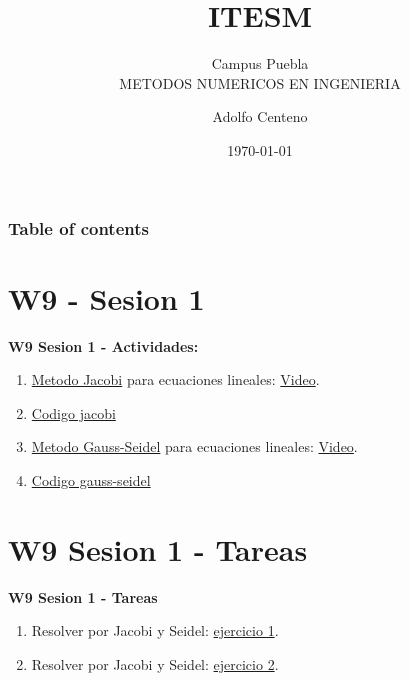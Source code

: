 \documentclass{beamer}
\begin{document}
\title{ITESM}  
\subtitle{Campus Puebla\\METODOS NUMERICOS EN INGENIERIA
}
\author{Adolfo Centeno}
\date{\today} 


\begin{frame}
\titlepage
\end{frame}

\begin{frame}\frametitle{Table of contents}
\tableofcontents
\end{frame} 


\section{W9 - Sesion 1 }

\begin{frame}

\textbf{W9 Sesion 1 - Actividades:}

\begin{enumerate}
\item
	\href{https://es.wikipedia.org/wiki/Metodo_de_Jacobi}{Metodo Jacobi} para ecuaciones lineales: \href{https://www.youtube.com/watch?v=TD83oN2LNdo}{Video}.	
\item
	\href{https://github.com/adsoftsito/metodos-numericos/blob/master/w9/jacobi/jacobi.pdf}{Codigo jacobi} 

\item
	\href{https://es.wikipedia.org/wiki/Metodo_de_Gauss-Seidel}{Metodo Gauss-Seidel} para ecuaciones lineales: \href{https://www.youtube.com/watch?v=abAe4418VdA&t=8s}{Video}.	
\item
	\href{https://github.com/adsoftsito/metodos-numericos/blob/master/w9/gauss-seidel/gauss_seidel.pdf}{Codigo gauss-seidel} 
	

\end{enumerate} 

\end{frame}


\section{W9 Sesion 1 - Tareas }

\begin{frame}


\textbf{W9 Sesion 1 - Tareas}


\begin{enumerate}
\item
	Resolver por Jacobi y Seidel: \href{https://www.youtube.com/watch?v=lEtDw4HUAmY&t=858s}{ejercicio 1}.	
\item
	Resolver por Jacobi y Seidel: \href{https://www.youtube.com/watch?v=k2dB1IVWTng}{ejercicio 2}.	

\end{enumerate} 


\end{frame}
\end{document}
